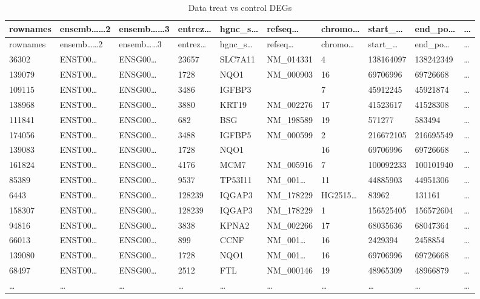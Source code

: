 \documentclass[
]{article}
\begin{document}
\begin{longtable}[]{@{}llllllllll@{}}
\caption{\label{tab:Data-treat-vs-control-DEGs}Data treat vs control DEGs}\tabularnewline
\toprule
rownames & ensemb\ldots\ldots2 & ensemb\ldots\ldots3 & entrez\ldots{} & hgnc\_s\ldots{} & refseq\ldots{} & chromo\ldots{} & start\_\ldots{} & end\_po\ldots{} & \ldots{}\tabularnewline
\midrule
\endfirsthead
\toprule
rownames & ensemb\ldots\ldots2 & ensemb\ldots\ldots3 & entrez\ldots{} & hgnc\_s\ldots{} & refseq\ldots{} & chromo\ldots{} & start\_\ldots{} & end\_po\ldots{} & \ldots{}\tabularnewline
\midrule
\endhead
36302 & ENST00\ldots{} & ENSG00\ldots{} & 23657 & SLC7A11 & NM\_014331 & 4 & 138164097 & 138242349 & \ldots{}\tabularnewline
139079 & ENST00\ldots{} & ENSG00\ldots{} & 1728 & NQO1 & NM\_000903 & 16 & 69706996 & 69726668 & \ldots{}\tabularnewline
109115 & ENST00\ldots{} & ENSG00\ldots{} & 3486 & IGFBP3 & & 7 & 45912245 & 45921874 & \ldots{}\tabularnewline
138968 & ENST00\ldots{} & ENSG00\ldots{} & 3880 & KRT19 & NM\_002276 & 17 & 41523617 & 41528308 & \ldots{}\tabularnewline
111841 & ENST00\ldots{} & ENSG00\ldots{} & 682 & BSG & NM\_198589 & 19 & 571277 & 583494 & \ldots{}\tabularnewline
174056 & ENST00\ldots{} & ENSG00\ldots{} & 3488 & IGFBP5 & NM\_000599 & 2 & 216672105 & 216695549 & \ldots{}\tabularnewline
139083 & ENST00\ldots{} & ENSG00\ldots{} & 1728 & NQO1 & & 16 & 69706996 & 69726668 & \ldots{}\tabularnewline
161824 & ENST00\ldots{} & ENSG00\ldots{} & 4176 & MCM7 & NM\_005916 & 7 & 100092233 & 100101940 & \ldots{}\tabularnewline
85389 & ENST00\ldots{} & ENSG00\ldots{} & 9537 & TP53I11 & NM\_001\ldots{} & 11 & 44885903 & 44951306 & \ldots{}\tabularnewline
6443 & ENST00\ldots{} & ENSG00\ldots{} & 128239 & IQGAP3 & NM\_178229 & HG2515\ldots{} & 83962 & 131161 & \ldots{}\tabularnewline
158307 & ENST00\ldots{} & ENSG00\ldots{} & 128239 & IQGAP3 & NM\_178229 & 1 & 156525405 & 156572604 & \ldots{}\tabularnewline
94816 & ENST00\ldots{} & ENSG00\ldots{} & 3838 & KPNA2 & NM\_002266 & 17 & 68035636 & 68047364 & \ldots{}\tabularnewline
66013 & ENST00\ldots{} & ENSG00\ldots{} & 899 & CCNF & NM\_001\ldots{} & 16 & 2429394 & 2458854 & \ldots{}\tabularnewline
139080 & ENST00\ldots{} & ENSG00\ldots{} & 1728 & NQO1 & NM\_001\ldots{} & 16 & 69706996 & 69726668 & \ldots{}\tabularnewline
68497 & ENST00\ldots{} & ENSG00\ldots{} & 2512 & FTL & NM\_000146 & 19 & 48965309 & 48966879 & \ldots{}\tabularnewline
\ldots{} & \ldots{} & \ldots{} & \ldots{} & \ldots{} & \ldots{} & \ldots{} & \ldots{} & \ldots{} & \ldots{}\tabularnewline
\bottomrule
\end{longtable}
\end{document}
